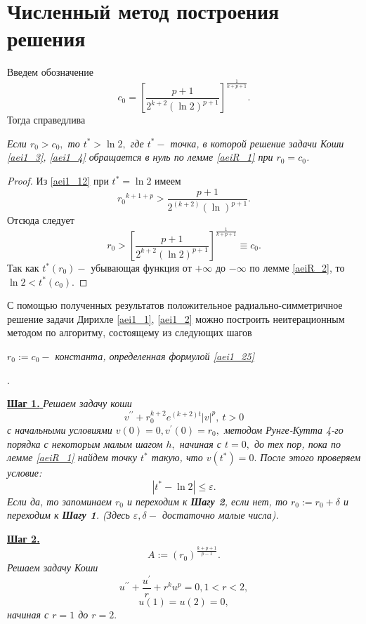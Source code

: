 \section{ Численный метод построения решения}
Введем обозначение
\begin{equation}\label{aei1_25}
c_0=\left [\frac{p+1}{2^{k+2}(\ln2)^{p+1}}\right ]^{\frac{1}{k+p+1}}.
\end{equation}
Тогда справедлива

 \begin{lemma}\label{aeiR_3}
 \textit{ Если $ r_0> c_0, $ то $ t^* >\ln2,$ где $ t^* -$ точка, в которой  решение задачи Коши \eqref{aei1_3}, \eqref{aei1_4} обращается в нуль по лемме \ref{aeiR_1} при $ r_0=c_0 $. }
 \end{lemma}

\begin{proof}
Из  \eqref{aei1_12} при $ t^*=\ln2 $ имеем
$$
{r_0}^{k+1+p} >\frac{p+1}{2^{(k+2)} (\ln)^{p+1}}.
$$
Отсюда следует
$$
r_0>\left [\frac{p+1}{2^{k+2}(\ln2)^{p+1}}\right ]^{\frac{1}{k+p+1}}\equiv c_0.
$$
Так как $t^*(r_0) -$ убывающая функция от $+\infty $ до $-\infty$ по лемме \ref{aeiR_2}, то $ \ln2 < t^*(c_0)$.

\end{proof}

С помощью полученных результатов положительное радиально-симметричное решение задачи Дирихле \eqref{aei1_1}, \eqref{aei1_2} можно построить неитерационным методом по алгоритму, состоящему из следующих шагов

\centerline\textit{ $ r_0:=c_0- $ константа, определенная формулой \eqref{aei1_25}}.

\underline{\textbf{ Шаг 1. }}
\textit{ Решаем задачу коши
\begin{equation*} %
v^{\prime\prime}+r_0^{k+2}e^{(k+2)t} {\vert v \vert}^p,\ t>0
\end{equation*}
 с начальными условиями
$
v(0)=0, v^{\prime}(0)=r_0,
$
методом Рунге-Кутта 4-го порядка с некоторым малым шагом $ h,$ начиная с $ t=0,$ до тех пор, пока по лемме \ref{aeiR_1} найдем точку $ t^*$ такую, что $ v(t^*)=0.$  После этого проверяем условие:}
$$
|t^*-\ln2| \leq\varepsilon.
$$
\textit{Если да, то  запоминаем $ r_0 $ и переходим к \textbf{ Шагу 2}, если нет, то $ r_0:=r_0+\delta$ и переходим к \textbf{ Шагу 1}.  (Здесь $\varepsilon, \delta - $ достаточно малые числа). }

\underline{\textbf{ Шаг 2. }}
$$
A:=\left (r_0 \right )^{\frac {k+p+1} {p-1}}.
$$
\textit{ Решаем задачу Коши
$$
u^{\prime \prime}+\frac{u^{\prime}}{r} +r^ku^p=0, 1<r<2,
$$
$$
u(1)=u(2)=0,
$$
начиная с $r=1$ до $r=2.$}

